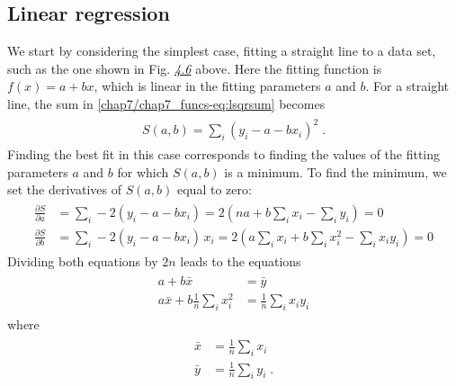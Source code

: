 \documentclass[letterpaper,10pt,english]{sphinxmanual}
\begin{document}
\subsection{Linear regression}
\label{chap7/chap7_funcs:linear-regression}
We start by considering the simplest case, fitting a straight line to a data set, such as the one shown in Fig. {\hyperref[chap7/chap7_funcs:fig-fallingmassdataplot]{\emph{4.6}}} above.  Here the fitting function is \(f(x) = a + bx\), which is linear in the fitting parameters \(a\) and \(b\).  For a straight line, the sum in \eqref{chap7/chap7_funcs-eq:lsqrsum} becomes
\label{chap7/chap7_funcs:equation-eq:linreg1}\begin{gather}
\begin{split}S(a,b) = \sum_{i} (y_{i} - a - bx_{i})^2 \;.\end{split}\label{chap7/chap7_funcs-eq:linreg1}
\end{gather}
Finding the best fit in this case corresponds to finding the values of the fitting parameters \(a\) and \(b\) for which \(S(a,b)\) is a minimum.  To find the minimum, we set the derivatives of \(S(a,b)\) equal to zero:
\label{chap7/chap7_funcs:equation-eq:linreg2}\begin{gather}
\begin{split}\frac{\partial S}{\partial a} &= \sum_{i}-2(y_{i}-a-bx_{i}) = 2 \left(na + b\sum_{i}x_{i} - \sum_{i}y_{i} \right) = 0 \\
\frac{\partial S}{\partial b} &= \sum_{i}-2(y_{i}-a-bx_{i})\,x_{i} = 2 \left(a\sum_{i}x_{i} + b\sum_{i}x_{i}^2 - \sum_{i}x_{i}y_{i} \right) = 0\end{split}\label{chap7/chap7_funcs-eq:linreg2}
\end{gather}
Dividing both equations by \(2n\) leads to the equations
\label{chap7/chap7_funcs:equation-eq:ablinreg}\begin{gather}
\begin{split}a + b\bar{x} &= \bar{y}\\
a\bar{x} + b\frac{1}{n}\sum_{i}x_{i}^2  &=  \frac{1}{n}\sum_{i}x_{i}y_{i}\end{split}\label{chap7/chap7_funcs-eq:ablinreg}
\end{gather}
where
\label{chap7/chap7_funcs:equation-eq:linreg3}\begin{gather}
\begin{split}\bar{x} &= \frac{1}{n}\sum_{i}x_{i}\\
\bar{y} &= \frac{1}{n}\sum_{i}y_{i}\;.\end{split}\label{chap7/chap7_funcs-eq:linreg3}
\end{gather}
\end{document}

